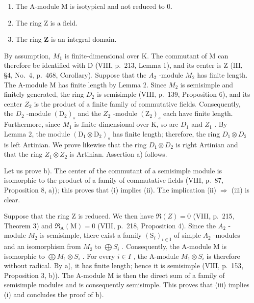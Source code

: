 \begin{enumerate}
\def\labelenumi{(\roman{enumi})}
\item
  The A-module M is isotypical and not reduced to 0.
\item
  The ring Z is a field.
\item
  The ring \(\mathbf{Z}\) is an integral domain.
\end{enumerate}

By assumption, \(M_{1}\) is finite-dimensional over K. The commutant of M can therefore be identified with D (VIII, p.~213, Lemma 1), and its center is Z (III, §4, No.~4, p.~468, Corollary). Suppose that the \(A_{2}\) -module \(M_{2}\) has finite length. The A-module M has finite length by Lemma 2. Since \(M_{2}\) is semisimple and finitely generated, the ring \(D_{2}\) is semisimple (VIII, p.~139, Proposition 6), and its center \(Z_{2}\) is the product of a finite family of commutative fields. Consequently, the \(D_{2}\) -module \((\mathrm{D}_{2})_{s}\) and the \(Z_{2}\) -module \((\mathrm{Z}_{2})_{s}\) each have finite length. Furthermore, since \(M_{1}\) is finite-dimensional over K, so are \(D_{1}\) and \(Z_{1}\) . By Lemma 2, the module \((\mathrm{D}_{1} \otimes \mathrm{D}_{2})_{s}\) has finite length; therefore, the ring \(D_{1} \otimes D_{2}\) is left Artinian. We prove likewise that the ring \(D_{1} \otimes D_{2}\) is right Artinian and that the ring \(Z_{1} \otimes Z_{2}\) is Artinian. Assertion a) follows.

Let us prove b). The center of the commutant of a semisimple module is isomorphic to the product of a family of commutative fields (VIII, p.~87, Proposition 8, a)); this proves that (i) implies (ii). The implication (ii) \(\Rightarrow\) (iii) is clear.

Suppose that the ring Z is reduced. We then have \(\Re(Z)=0\) (VIII, p.~215, Theorem 3) and \(\Re_{\mathrm{A}}(\mathrm{M})=0\) (VIII, p.~218, Proposition 4). Since the \(A_{2}\) -module \(M_{2}\) is semisimple, there exist a family \((\mathrm{S}_{i})_{i\in\mathrm{I}}\) of simple \(A_{2}\) -modules and an isomorphism from \(M_{2}\) to \(\bigoplus S_{i}\) . Consequently, the A-module M is isomorphic to \(\bigoplus M_{1}\otimes S_{i}\) . For every \(i\in I\) , the A-module \(M_{1}\otimes S_{i}\) is therefore without radical. By a), it has finite length; hence it is semisimple (VIII, p.~153, Proposition 3, b)). The A-module M is then the direct sum of a family of semisimple modules and is consequently semisimple. This proves that (iii) implies (i) and concludes the proof of b).

